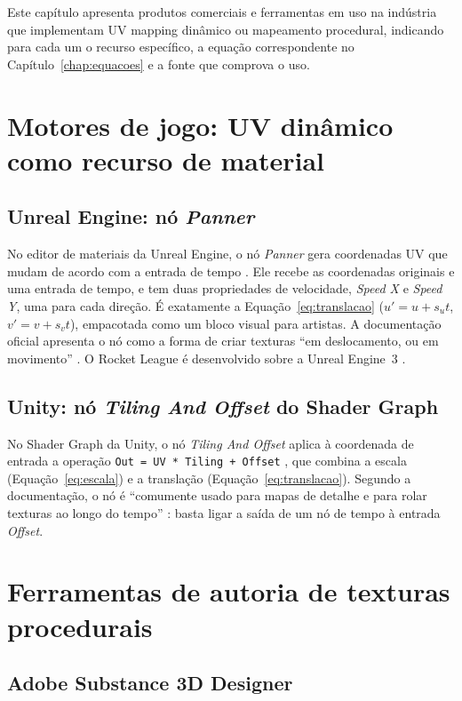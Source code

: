 
Este capítulo apresenta produtos comerciais e ferramentas em uso na indústria que implementam UV mapping dinâmico ou mapeamento procedural, indicando para cada um o recurso específico, a equação correspondente no Capítulo~\ref{chap:equacoes} e a fonte que comprova o uso.

\section{Motores de jogo: UV dinâmico como recurso de material}

\subsection{Unreal Engine: nó \textit{Panner}}

No editor de materiais da Unreal Engine, o nó \textit{Panner} gera coordenadas UV que mudam de acordo com a entrada de tempo \cite{unrealpanner}. Ele recebe as coordenadas originais e uma entrada de tempo, e tem duas propriedades de velocidade, \textit{Speed X} e \textit{Speed Y}, uma para cada direção. É exatamente a Equação~\eqref{eq:translacao} (\(u'=u+s_u t\), \(v'=v+s_v t\)), empacotada como um bloco visual para artistas. A documentação oficial apresenta o nó como a forma de criar texturas ``em deslocamento, ou em movimento'' \cite{unrealpanner}. O Rocket League é desenvolvido sobre a Unreal Engine~3 \cite{substance}.

\subsection{Unity: nó \textit{Tiling And Offset} do Shader Graph}

No Shader Graph da Unity, o nó \textit{Tiling And Offset} aplica à coordenada de entrada a operação \texttt{Out = UV * Tiling + Offset} \cite{unitytiling}, que combina a escala (Equação~\eqref{eq:escala}) e a translação (Equação~\eqref{eq:translacao}). Segundo a documentação, o nó é ``comumente usado para mapas de detalhe e para rolar texturas ao longo do tempo'' \cite{unitytiling}: basta ligar a saída de um nó de tempo à entrada \textit{Offset}.

\section{Ferramentas de autoria de texturas procedurais}

\subsection{Adobe Substance 3D Designer}

